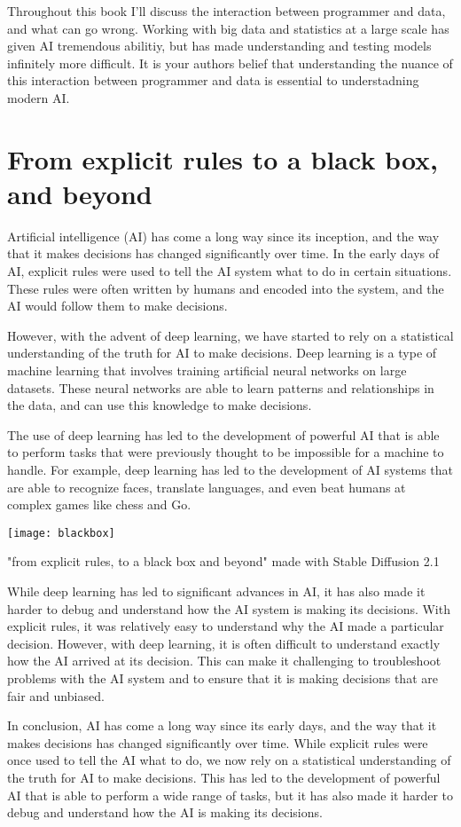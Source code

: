 Throughout this book I'll discuss the interaction between programmer and data, and what can go wrong. Working with big data and statistics at a large scale has given AI tremendous abilitiy, but has made understanding and testing models infinitely more difficult. It is your authors belief that understanding the nuance of this interaction between programmer and data is essential to understadning modern AI.

\section{From explicit rules to a black box, and beyond}

Artificial intelligence (AI) has come a long way since its inception, and the way that it makes decisions has changed significantly over time. In the early days of AI, explicit rules were used to tell the AI system what to do in certain situations. These rules were often written by humans and encoded into the system, and the AI would follow them to make decisions.

However, with the advent of deep learning, we have started to rely on a statistical understanding of the truth for AI to make decisions. Deep learning is a type of machine learning that involves training artificial neural networks on large datasets. These neural networks are able to learn patterns and relationships in the data, and can use this knowledge to make decisions.

The use of deep learning has led to the development of powerful AI that is able to perform tasks that were previously thought to be impossible for a machine to handle. For example, deep learning has led to the development of AI systems that are able to recognize faces, translate languages, and even beat humans at complex games like chess and Go.

\begin{marginfigure}[-5.5cm]
        \texttt{[image: blackbox]}
        \caption{"from explicit rules, to a black box and beyond" made with Stable Diffusion 2.1}
\end{marginfigure}

While deep learning has led to significant advances in AI, it has also made it harder to debug and understand how the AI system is making its decisions. With explicit rules, it was relatively easy to understand why the AI made a particular decision. However, with deep learning, it is often difficult to understand exactly how the AI arrived at its decision. This can make it challenging to troubleshoot problems with the AI system and to ensure that it is making decisions that are fair and unbiased.

In conclusion, AI has come a long way since its early days, and the way that it makes decisions has changed significantly over time. While explicit rules were once used to tell the AI what to do, we now rely on a statistical understanding of the truth for AI to make decisions. This has led to the development of powerful AI that is able to perform a wide range of tasks, but it has also made it harder to debug and understand how the AI is making its decisions.
